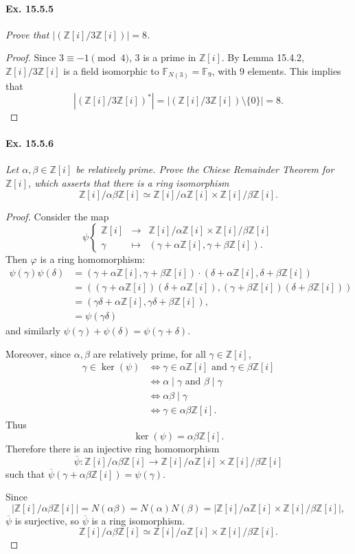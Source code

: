 \documentclass[11pt,a4paper]{article}
\newcommand{\Z}{\mathbb{Z}}
\newcommand{\F}{\mathbb{F}}
\begin{document}
\paragraph{Ex. 15.5.5}{\it  Prove that $\left |  \left (\Z[i]/3 \Z[i] \right) \right | = 8$.
}
\begin{proof} 
Since $3 \equiv -1 \pmod 4$, $3$ is a prime in $\Z[i]$. By Lemma 15.4.2, $\Z[i]/3 \Z[i]$ is a field isomorphic to $\F_{N(3)} = \F_9$, with $9$ elements. This implies that 
$$\left | \left( \Z[i]/3 \Z[i]\right)^* \right | = \left | \left( \Z[i]/3 \Z[i]\right ) \setminus \{0\} \right | = 8.$$
\end{proof}

\paragraph{Ex. 15.5.6}{\it  Let $\alpha,\beta \in \Z[i]$ be relatively prime. Prove the Chiese Remainder Theorem for $\Z[i]$, which asserts that there is a ring isomorphism
$$\Z[i]/\alpha\beta \Z[i] \simeq \Z[i]/ \alpha \Z[i] \times \Z[i]/\beta \Z[i].$$
}
\begin{proof} 
Consider the map
$$
\psi
\left\{
\begin{array}{ccc}
\Z[i] & \to & \Z[i]/ \alpha \Z[i] \times \Z[i]/\beta \Z[i]\\
\gamma & \mapsto & (\gamma + \alpha \Z[i], \gamma + \beta \Z[i]).
\end{array}
\right.
$$
Then $\varphi$ is a ring homomorphism:
\begin{align*}
\psi(\gamma) \psi(\delta) &= (\gamma + \alpha \Z[i], \gamma + \beta \Z[i]) \cdot (\delta + \alpha \Z[i], \delta + \beta \Z[i])\\
&= ((\gamma + \alpha \Z[i])(\delta + \alpha \Z[i]), (\gamma + \beta \Z[i])(\delta + \beta \Z[i]))\\
&=(\gamma \delta + \alpha \Z[i], \gamma \delta + \beta \Z[i]),\\
&= \psi(\gamma \delta)
\end{align*}
and similarly $\psi(\gamma) + \psi(\delta) = \psi(\gamma + \delta)$.

Moreover, since $\alpha, \beta$ are relatively prime, for all $\gamma \in \Z[i]$,
\begin{align*}
\gamma \in \ker(\psi) & \iff \gamma \in \alpha \Z[i] \text{ and } \gamma \in \beta \Z[i]\\
 & \iff \alpha \mid \gamma \text{ and }\beta \mid \gamma\\
 & \iff \alpha \beta \mid \gamma\\
 & \iff  \gamma \in \alpha \beta \Z[i].
 \end{align*}
Thus 
$$\ker(\psi) = \alpha \beta \Z[i].$$
Therefore there is an injective ring homomorphism
$$\overline{\psi}: \Z[i]/\alpha\beta \Z[i] \to  \Z[i]/ \alpha \Z[i] \times \Z[i]/\beta \Z[i]$$
such that $\overline{\psi}(\gamma + \alpha \beta \Z[i]) = \psi(\gamma)$.

Since
$$\left |\Z[i]/\alpha\beta \Z[i] \right | = N(\alpha \beta) = N(\alpha) N(\beta) =\left |\Z[i]/ \alpha \Z[i] \times \Z[i]/\beta \Z[i] \right|,$$
$\overline{\psi}$ is surjective, so $\overline{\psi}$ is a ring isomorphism.
$$\Z[i]/\alpha\beta \Z[i] \simeq \Z[i]/ \alpha \Z[i] \times \Z[i]/\beta \Z[i].$$
\end{proof}
\end{document}
